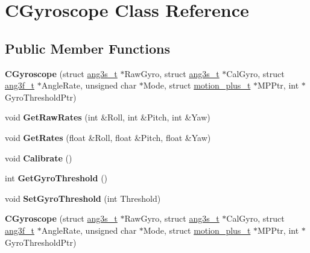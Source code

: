 \hypertarget{class_c_gyroscope}{\section{C\-Gyroscope Class Reference}
\label{class_c_gyroscope}
}
\subsection*{Public Member Functions}
\begin{DoxyCompactItemize}
\item 
\hypertarget{class_c_gyroscope_a065f7be42b432dbc9f57c0a3a9e2b88b}{{\bfseries C\-Gyroscope} (struct \hyperlink{structang3s__t}{ang3s\-\_\-t} $\ast$Raw\-Gyro, struct \hyperlink{structang3s__t}{ang3s\-\_\-t} $\ast$Cal\-Gyro, struct \hyperlink{structang3f__t}{ang3f\-\_\-t} $\ast$Angle\-Rate, unsigned char $\ast$Mode, struct \hyperlink{structmotion__plus__t}{motion\-\_\-plus\-\_\-t} $\ast$M\-P\-Ptr, int $\ast$Gyro\-Threshold\-Ptr)}\label{class_c_gyroscope_a065f7be42b432dbc9f57c0a3a9e2b88b}

\item 
\hypertarget{class_c_gyroscope_ab8d7db3bf44a8686d91e8fae5824af97}{void {\bfseries Get\-Raw\-Rates} (int \&Roll, int \&Pitch, int \&Yaw)}\label{class_c_gyroscope_ab8d7db3bf44a8686d91e8fae5824af97}

\item 
\hypertarget{class_c_gyroscope_a96b2a55ace21483305ef3f64bf415092}{void {\bfseries Get\-Rates} (float \&Roll, float \&Pitch, float \&Yaw)}\label{class_c_gyroscope_a96b2a55ace21483305ef3f64bf415092}

\item 
\hypertarget{class_c_gyroscope_a690a6e901390f2b57d0e48c03d00bc0f}{void {\bfseries Calibrate} ()}\label{class_c_gyroscope_a690a6e901390f2b57d0e48c03d00bc0f}

\item 
\hypertarget{class_c_gyroscope_a36ee104d7a2304c3b414cf48910c9fcb}{int {\bfseries Get\-Gyro\-Threshold} ()}\label{class_c_gyroscope_a36ee104d7a2304c3b414cf48910c9fcb}

\item 
\hypertarget{class_c_gyroscope_ace5399f8d1305a5ac8391fdaee52e32d}{void {\bfseries Set\-Gyro\-Threshold} (int Threshold)}\label{class_c_gyroscope_ace5399f8d1305a5ac8391fdaee52e32d}

\item 
\hypertarget{class_c_gyroscope_a065f7be42b432dbc9f57c0a3a9e2b88b}{{\bfseries C\-Gyroscope} (struct \hyperlink{structang3s__t}{ang3s\-\_\-t} $\ast$Raw\-Gyro, struct \hyperlink{structang3s__t}{ang3s\-\_\-t} $\ast$Cal\-Gyro, struct \hyperlink{structang3f__t}{ang3f\-\_\-t} $\ast$Angle\-Rate, unsigned char $\ast$Mode, struct \hyperlink{structmotion__plus__t}{motion\-\_\-plus\-\_\-t} $\ast$M\-P\-Ptr, int $\ast$Gyro\-Threshold\-Ptr)}\label{class_c_gyroscope_a065f7be42b432dbc9f57c0a3a9e2b88b}


\end{DoxyCompactItemize}
